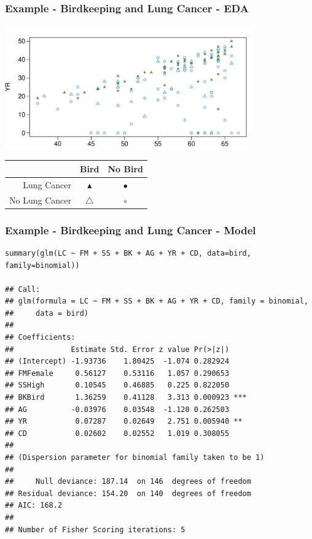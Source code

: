 \begin{frame}
\frametitle{Example - Birdkeeping and Lung Cancer - EDA}

\begin{center}
\includegraphics[width=0.8\textwidth]{9-5_logistic_reg/figures/birds/birds.pdf}
\end{center}

{\scriptsize
\begin{center}
\begin{tabular}{r|cc}
               & Bird             & No Bird \\
\hline               
Lung Cancer    & \textcolor{oiG}{$\blacktriangle$} & \textcolor{oiG}{$\bullet$} \\
No Lung Cancer & \textcolor{oiB}{$\triangle$}      & \textcolor{oiB}{$\circ$}
\end{tabular}
\end{center}
}

 
 
\end{frame}


\begin{frame}[fragile]
\frametitle{Example - Birdkeeping and Lung Cancer - Model}

\vspace{-5mm}

{\tiny
\begin{verbatim}
summary(glm(LC ~ FM + SS + BK + AG + YR + CD, data=bird, family=binomial))

## Call:
## glm(formula = LC ~ FM + SS + BK + AG + YR + CD, family = binomial, 
##     data = bird)
## 
## Coefficients:
##             Estimate Std. Error z value Pr(>|z|)    
## (Intercept) -1.93736    1.80425  -1.074 0.282924    
## FMFemale     0.56127    0.53116   1.057 0.290653    
## SSHigh       0.10545    0.46885   0.225 0.822050    
## BKBird       1.36259    0.41128   3.313 0.000923 ***
## AG          -0.03976    0.03548  -1.120 0.262503    
## YR           0.07287    0.02649   2.751 0.005940 ** 
## CD           0.02602    0.02552   1.019 0.308055    
## 
## (Dispersion parameter for binomial family taken to be 1)
## 
##     Null deviance: 187.14  on 146  degrees of freedom
## Residual deviance: 154.20  on 140  degrees of freedom
## AIC: 168.2
## 
## Number of Fisher Scoring iterations: 5
\end{verbatim}
}

\end{frame}

